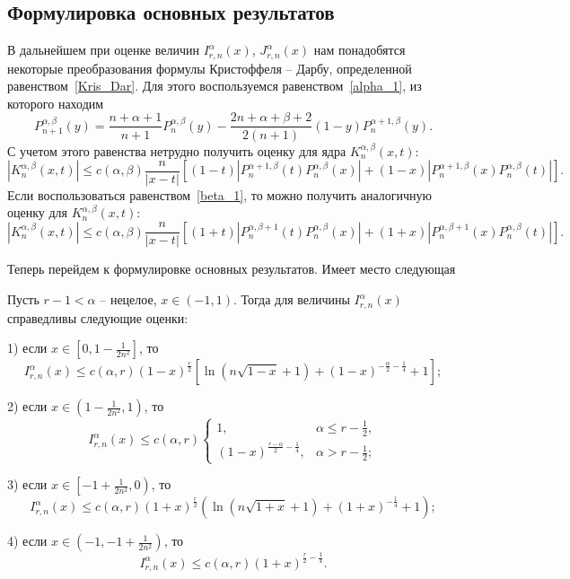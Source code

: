\subsection{Формулировка основных результатов}

В дальнейшем при оценке величин $I_{r,n}^\alpha(x)$, $J_{r,n}^\alpha(x)$ нам понадобятся некоторые преобразования формулы Кристоффеля -- Дарбу, определенной равенством~\eqref{Kris_Dar}. Для этого воспользуемся равенством~\eqref{alpha_1}, из которого находим
$$
P_{n+1}^{\alpha,\beta}(y)=\frac{n+\alpha+1}{n+1}P_{n}^{\alpha,\beta}(y)-\frac{2n+\alpha+\beta+2}{2(n+1)}(1-y)P_{n}^{\alpha+1,\beta}(y).
$$
С учетом этого равенства нетрудно получить оценку для ядра $K_n^{\alpha,\beta}(x,t)$:
$$
|K_n^{\alpha,\beta}(x,t)|\le
c(\alpha,\beta)\frac{n}{|x-t|}\left[(1-t)|P_{n}^{\alpha+1,\beta}(t)P_{n}^{\alpha,\beta}(x)|+
(1-x)|P_{n}^{\alpha+1,\beta}(x)P_{n}^{\alpha,\beta}(t)|\right].
$$
Если воспользоваться равенством~\eqref{beta_1}, то можно получить аналогичную оценку для $K_n^{\alpha,\beta}(x,t)$:
$$
|K_n^{\alpha,\beta}(x,t)|\le
c(\alpha,\beta)\frac{n}{|x-t|}\left[(1+t)|P_{n}^{\alpha,\beta+1}(t)P_{n}^{\alpha,\beta}(x)|+
(1+x)|P_{n}^{\alpha,\beta+1}(x)P_{n}^{\alpha,\beta}(t)|\right].
$$

Теперь перейдем к формулировке основных результатов. Имеет место следующая
\begin{theorem}\label{Ram-theo1}
	Пусть $r-1<\alpha$ -- нецелое, $x\in(-1,1)$. Тогда для величины $I_{r,n}^\alpha(x)$ справедливы следующие оценки:
	
	1) если $x\in\left[0,1-\frac{1}{2n^2}\right]$, то
	\begin{equation*}
		I_{r,n}^\alpha(x)\le c(\alpha,r)(1-x)^{\frac{r}{2}}\left[\ln(n\sqrt{1-x}+1)+(1-x)^{-\frac{\alpha}{2}-\frac14}+1\right];
	\end{equation*}
	
	2) если $x\in\left(1-\frac{1}{2n^2},1\right)$, то
	\begin{equation*}
		I_{r,n}^\alpha(x)\le c(\alpha,r)
		\begin{cases}
			1, & \alpha\le r-\frac12, \\
			(1-x)^{\frac{r-\alpha}{2}-\frac14}, & \alpha>r-\frac12;
		\end{cases}
	\end{equation*}
	
	3) если $x\in\left[-1+\frac{1}{2n^2},0\right)$, то
	\begin{equation*}
		I_{r,n}^\alpha(x)\le c(\alpha,r)(1+x)^{\frac{r}{2}}\left(\ln(n\sqrt{1+x}+1)+(1+x)^{-\frac14}+1\right);
	\end{equation*}
	
	4) если $x\in\left(-1,-1+\frac{1}{2n^2}\right)$, то
	\begin{equation*}
		I_{r,n}^\alpha(x)\le c(\alpha,r)(1+x)^{\frac{r}{2}-\frac14}.
	\end{equation*}
\end{theorem}

